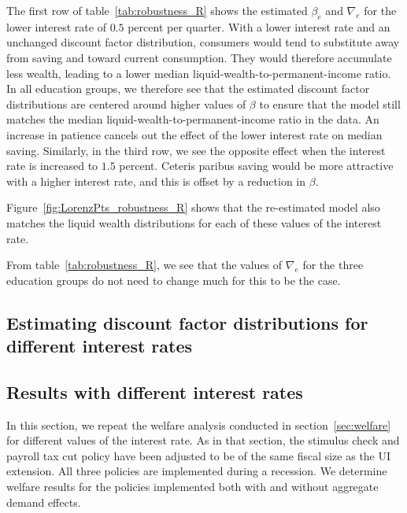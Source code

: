 \documentclass{econsocart}
\begin{document}
The first row of table~\ref{tab:robustness_R} shows the estimated $\beta_e$ and $\nabla_e$ for the lower interest rate of $0.5$ percent per quarter.
With a lower interest rate and an unchanged discount factor distribution, consumers would tend to substitute away from saving and toward current consumption.
They would therefore accumulate less wealth, leading to a lower median liquid-wealth-to-permanent-income ratio.
In all education groups, we therefore see that the estimated discount factor distributions are centered around higher values of $\beta$ to ensure that the model still matches the median liquid-wealth-to-permanent-income ratio in the data.
An increase in patience cancels out the effect of the lower interest rate on median saving.
Similarly, in the third row, we see the opposite effect when the interest rate is increased to $1.5$ percent.
Ceteris paribus saving would be more attractive with a higher interest rate, and this is offset by a reduction in $\beta$.

Figure~\ref{fig:LorenzPts_robustness_R} shows that the re-estimated model also matches the liquid wealth distributions for each of these values of the interest rate.



From table~\ref{tab:robustness_R}, we see that the values of $\nabla_e$ for the three education groups do not need to change much for this to be the case.

\subsection*{Estimating discount factor distributions for different interest rates}
\whenintegrated{\label{app:DF_R}} %

\subsection*{Results with different interest rates}
\whenintegrated{\label{sec:robust_R_results}} %

In this section, we repeat the welfare analysis conducted in section~\ref{sec:welfare} for different values of the interest rate.
As in that section, the stimulus check and payroll tax cut policy have been adjusted to be of the same fiscal size as the UI extension.
All three policies are implemented during a recession.
We determine welfare results for the policies implemented both with and without aggregate demand effects.
\end{document}
